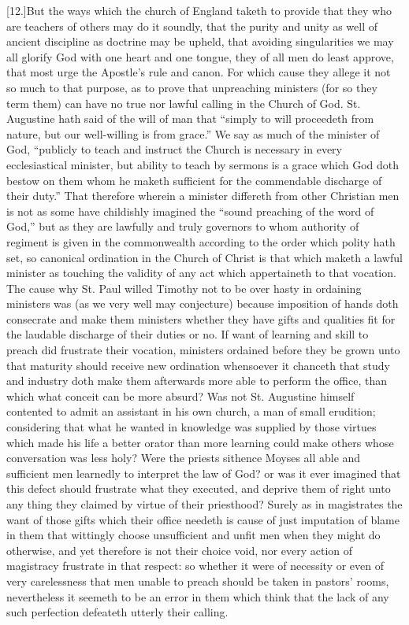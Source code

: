 [12.]But the ways which the church of England taketh to provide that they who are teachers of others may do it soundly, that the purity and unity as well of ancient discipline as doctrine may be upheld, that avoiding singularities we may all glorify God with one heart and one tongue, they of all men do least approve, that most urge the Apostle’s rule and canon. For which cause they allege it not so much to that purpose, as to prove that unpreaching ministers (for so they term them) can have no true nor lawful calling in the Church of God. St. Augustine hath said of the will of man that “simply to will proceedeth from nature, but our well-willing is from grace.” We say as much of the minister of God, “publicly to teach and instruct the Church is necessary in every ecclesiastical minister, but ability to teach by sermons is a grace which God doth bestow on them whom he maketh sufficient for the commendable discharge of their duty.” That therefore wherein a minister differeth from other Christian men is not as some have childishly imagined the “sound preaching of the word of God,” but as they are lawfully and truly governors to whom authority of regiment  is given in the commonwealth according to the order which polity hath set,
 so canonical ordination in the Church of Christ is that which maketh a lawful minister as touching the validity of any act which appertaineth to that vocation. The cause why St. Paul willed Timothy not to be over hasty in ordaining ministers was (as we very well may conjecture) because imposition of hands doth consecrate and make them ministers whether they have gifts and qualities fit for the laudable discharge of their duties or no. If want of learning and skill to preach did frustrate their vocation, ministers ordained before they be grown unto that maturity should receive new ordination whensoever it chanceth that study and industry doth make them afterwards more able to perform the office, than which what conceit can be more absurd? Was not St. Augustine himself contented to admit an assistant in his own church, a man of small erudition; considering that what he wanted in knowledge was supplied by those virtues which made his life a better orator than more learning could make others whose conversation was less holy? Were the priests sithence Moyses all able and sufficient men learnedly to interpret the law of God? or was it ever imagined that this defect should frustrate what they executed, and deprive them of right unto any thing they claimed by virtue of their priesthood? Surely as in magistrates the want of those gifts which their office needeth is cause of just imputation of blame in them that wittingly choose unsufficient and unfit men when they might do otherwise, and yet therefore is not their choice void, nor every action of magistracy frustrate in that respect: so whether it were of necessity or even of very carelessness that men unable to preach should be taken in pastors’ rooms, nevertheless it seemeth to be an error in them which think that the lack of any such perfection defeateth utterly their calling.

